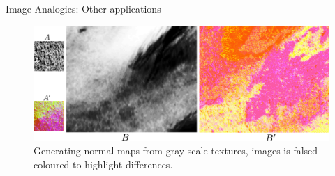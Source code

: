 \documentclass{beamer}
\begin{document}

\begin{frame}{Image Analogies: Other applications}
\begin{figure}
        \centering
        \includegraphics[width=\textwidth]{img/normal_generation}
        \caption{Generating normal maps from gray scale textures, images is falsed-coloured to highlight differences.}
\end{figure}
\end{frame}


%

%


\end{document}
